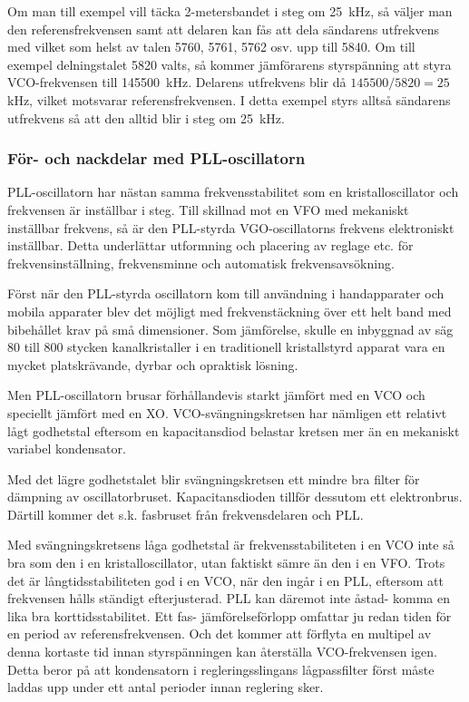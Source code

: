 Om man till exempel vill täcka 2-metersbandet i steg om 25~kHz, så väljer
man den referensfrekvensen samt att delaren kan fås att dela sändarens
utfrekvens med vilket som helst av talen 5760, 5761, 5762 osv. upp till 5840.
Om till exempel delningstalet 5820 valts, så kommer jämförarens styrspänning att styra
VCO-frekvensen till 145500~kHz.
Delarens utfrekvens blir då \(145500/5820 = 25\) kHz, vilket motsvarar
referensfrekvensen.
I detta exempel styrs alltså sändarens utfrekvens så att den alltid blir i steg
om 25~kHz.

\subsubsection{För- och nackdelar med PLL-oscillatorn}

PLL-oscillatorn har nästan samma frekvensstabilitet som en
kristalloscillator och frekvensen är inställbar i steg.
Till skillnad mot en VFO med mekaniskt inställbar frekvens, så är den PLL-styrda
VGO-oscillatorns frekvens elektroniskt inställbar.
Detta underlättar utformning och placering av reglage etc. för
frekvensinställning, frekvensminne och automatisk frekvensavsökning.

Först när den PLL-styrda oscillatorn kom till användning i handapparater och
mobila apparater blev det möjligt med frekvenstäckning över ett helt band med
bibehållet krav på små dimensioner.
Som jämförelse, skulle en inbyggnad av säg 80 till 800 stycken kanalkristaller
i en traditionell kristallstyrd apparat vara en mycket platskrävande, dyrbar
och opraktisk lösning.

Men PLL-oscillatorn brusar förhållandevis starkt jämfört med en VCO
och speciellt jämfört med en XO.
VCO-svängningskretsen har nämligen ett relativt lågt godhetstal eftersom en
kapacitansdiod belastar kretsen mer än en mekaniskt variabel kondensator.

Med det lägre godhetstalet blir svängningskretsen ett mindre bra
filter för dämpning av oscillatorbruset.
Kapacitansdioden tillför dessutom ett elektronbrus.
Därtill kommer det s.k. fasbruset från frekvensdelaren och PLL.

Med svängningskretsens låga godhetstal är frekvensstabiliteten i en VCO inte så
bra som den i en kristalloscillator, utan faktiskt sämre än den i en VFO.
Trots det är långtidsstabiliteten god i en VCO, när den ingår i en PLL,
eftersom att frekvensen hålls ständigt efterjusterad.
PLL kan däremot inte åstad- komma en lika bra korttidsstabilitet.
Ett fas- jämförelseförlopp omfattar ju redan tiden för en period av
referensfrekvensen.
Och det kommer att förflyta en multipel av denna kortaste tid innan
styrspänningen kan återställa VCO-frekvensen igen.
Detta beror på att kondensatorn i regleringsslingans lågpassfilter först måste
laddas upp under ett antal perioder innan reglering sker.

